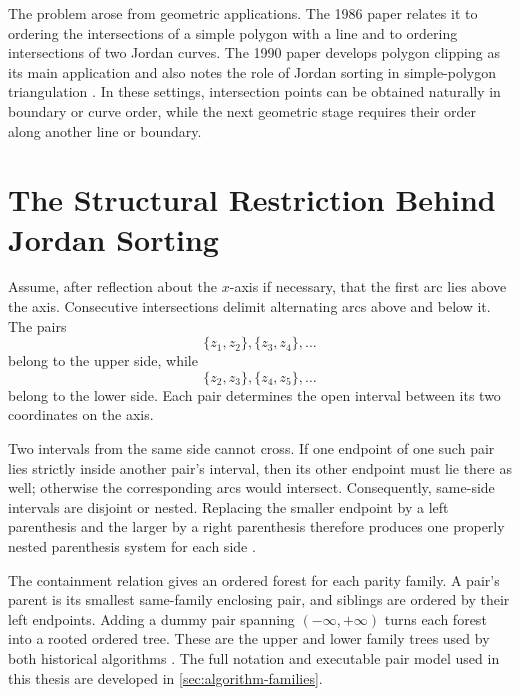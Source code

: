 The problem arose from geometric applications. The 1986 paper relates it to ordering the
intersections of a simple polygon with a line and to ordering intersections
of two Jordan curves. The 1990 paper develops polygon clipping as its main
application and also notes the role of Jordan sorting in simple-polygon
triangulation
\parencites[pp.~170--171]{hoffmann1986sorting}[pp.~85--86]{fung1990simplified}.
In these settings, intersection
points can be obtained naturally in boundary or curve order, while the next
geometric stage requires their order along another line or boundary.

\section{The Structural Restriction Behind Jordan Sorting}
\label{sec:background-structure}

Assume, after reflection about the $x$-axis if necessary, that the first arc
lies above the axis. Consecutive intersections delimit alternating arcs above
and below it. The pairs
\begin{equation}
  \{z_1,z_2\},\{z_3,z_4\},\ldots
\end{equation}
belong to the upper side, while
\begin{equation}
  \{z_2,z_3\},\{z_4,z_5\},\ldots
\end{equation}
belong to the lower side. Each pair determines the open interval between its
two coordinates on the axis.

Two intervals from the same side cannot cross. If one endpoint of one such
pair lies strictly inside another pair's interval, then its other endpoint
must lie there as well; otherwise the corresponding arcs would intersect.
Consequently, same-side intervals are disjoint or nested. Replacing the
smaller endpoint by a left parenthesis and the larger by a right parenthesis
therefore produces one properly nested parenthesis system for each side
\parencite[pp.~172--173]{hoffmann1986sorting}.

The containment relation gives an ordered forest for each parity family. A
pair's parent is its smallest same-family enclosing pair, and siblings are
ordered by their left endpoints. Adding a dummy pair spanning
$(-\infty,+\infty)$ turns each forest into a rooted ordered tree. These are
the upper and lower family trees used by both historical algorithms
\parencites[p.~173]{hoffmann1986sorting}[p.~87]{fung1990simplified}. The full
notation and executable pair model used in this thesis are developed in
\cref{sec:algorithm-families}.

